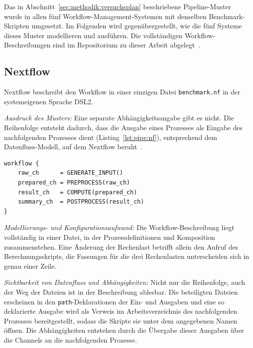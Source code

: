 \begin{sloppypar}
Das in Abschnitt~\ref{sec:methodik:versuchsplan} beschriebene
Pipeline-Muster wurde in allen fünf Workflow-Management-Systemen mit denselben Benchmark-Skripten umgesetzt. Im Folgenden wird gegenübergestellt, wie die fünf Systeme dieses Muster modellieren und ausführen. Die vollständigen Workflow-Beschreibungen sind im Repositorium zu dieser Arbeit abgelegt~\cite{barepo}.
\end{sloppypar}

\subsection{Nextflow}
\label{sec:lokal:pipeline:nextflow}

Nextflow beschreibt den Workflow in einer einzigen Datei
\texttt{benchmark.nf} in der systemeigenen Sprache DSL2.

\emph{Ausdruck des Musters:} Eine separate Abhängigkeitsangabe gibt
es nicht. Die Reihenfolge entsteht dadurch, dass die Ausgabe eines
Prozesses als Eingabe des nachfolgenden Prozesses dient (Listing~\ref{lst:pipe:nf}), entsprechend
dem Datenfluss-Modell, auf dem Nextflow
beruht~\cite[S.~317]{ditommaso2017nextflow}.

\begin{lstlisting}[caption={workflow-Block aus benchmark.nf (Nextflow, Pipeline)},label={lst:pipe:nf}]
workflow {
    raw_ch      = GENERATE_INPUT()
    prepared_ch = PREPROCESS(raw_ch)
    result_ch   = COMPUTE(prepared_ch)
    summary_ch  = POSTPROCESS(result_ch)
}
\end{lstlisting}

\emph{Modellierungs- und Konfigurationsaufwand:} Die
Workflow-Beschreibung liegt vollständig in einer Datei, in der
Prozessdefinitionen und Komposition zusammenstehen. Eine Änderung der
Rechenlast betrifft allein den Aufruf des Berechnungsskripts, die
Fassungen für die drei Rechenlasten unterscheiden sich in genau einer
Zeile.

\emph{Sichtbarkeit von Datenfluss und Abhängigkeiten:} Nicht nur die
Reihenfolge, auch der Weg der Dateien ist in der Beschreibung
ablesbar. Die beteiligten Dateien erscheinen in den
\texttt{path}-Deklarationen der Ein- und Ausgaben und eine so
deklarierte Ausgabe wird als Verweis im Arbeitsverzeichnis des
nachfolgenden Prozesses bereitgestellt, sodass die Skripte sie unter
dem angegebenen Namen öffnen. Die Abhängigkeiten entstehen durch die
Übergabe dieser Ausgaben über die Channels an die nachfolgenden
Prozesse.

